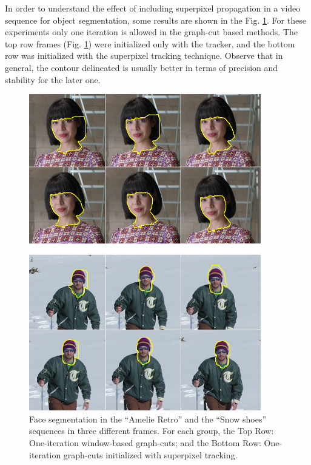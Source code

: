 In order to understand the effect of including superpixel propagation in a video sequence for object
segmentation, some results are shown in the Fig. \ref{figurelabel_comp}. For these experiments only one iteration is
allowed in the graph-cut based methods. The top row frames (Fig. \ref{figurelabel_comp}) were initialized only with the tracker, 
and the bottom row was initialized with the superpixel tracking technique. 
Observe that in general, the contour delineated is usually better in terms of precision and
stability for the later one.
   \begin{figure}[thpb]
      \centering
      \includegraphics[width=0.9\textwidth]{../images/Compare.png}
      \caption{Face segmentation in the “Amelie Retro” and the
	      “Snow shoes” sequences in three different frames. For each
	       group, the Top Row: One-iteration window-based graph-cuts;
	       and the Bottom Row: One-iteration graph-cuts initialized with superpixel tracking.}
      \label{figurelabel_comp}
   \end{figure}
